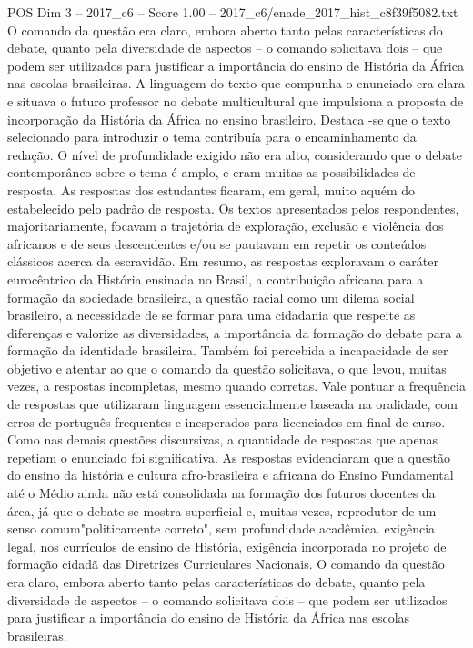\begin{textsample}{POS Dim 3 – 2017\_c6 – Score 1.00 – 2017\_c6/enade\_2017\_hist\_c8f39f5082.txt}
O comando da questão era claro, embora aberto tanto pelas características do debate, quanto pela diversidade de aspectos – o comando solicitava dois – que podem ser utilizados para justificar a importância do ensino de História da África nas escolas brasileiras.
A linguagem do texto que compunha o enunciado era clara e situava o futuro professor no debate multicultural que impulsiona a proposta de incorporação da História da África no ensino brasileiro.
Destaca -se que o texto selecionado para introduzir o tema contribuía para o encaminhamento da redação.
O nível de profundidade exigido não era alto, considerando que o debate contemporâneo sobre o tema é amplo, e eram muitas as possibilidades de resposta.
As respostas dos estudantes ficaram, em geral, muito aquém do estabelecido pelo padrão de resposta.
Os textos apresentados pelos respondentes, majoritariamente, focavam a trajetória de exploração, exclusão e violência dos africanos e de seus descendentes e/ou se pautavam em repetir os conteúdos clássicos acerca da escravidão.
Em resumo, as respostas exploravam o caráter eurocêntrico da História ensinada no Brasil, a contribuição africana para a formação da sociedade brasileira, a questão racial como um dilema social brasileiro, a necessidade de se formar para uma cidadania que respeite as diferenças e valorize as diversidades, a importância da formação do debate para a formação da identidade brasileira.
Também foi percebida a incapacidade de ser objetivo e atentar ao que o comando da questão solicitava, o que levou, muitas vezes, a respostas incompletas, mesmo quando corretas.
Vale pontuar a frequência de respostas que utilizaram linguagem essencialmente baseada na oralidade, com erros de português frequentes e inesperados para licenciados em final de curso.
Como nas demais questões discursivas, a quantidade de respostas que apenas repetiam o enunciado foi significativa.
As respostas evidenciaram que a questão do ensino da história e cultura afro-brasileira e africana do Ensino Fundamental até o Médio ainda não está consolidada na formação dos futuros docentes da área, já que o debate se mostra superficial e, muitas vezes, reprodutor de um senso comum"politicamente correto", sem profundidade acadêmica. exigência legal, nos currículos de ensino de História, exigência incorporada no projeto de formação cidadã das Diretrizes Curriculares Nacionais.
O comando da questão era claro, embora aberto tanto pelas características do debate, quanto pela diversidade de aspectos – o comando solicitava dois – que podem ser utilizados para justificar a importância do ensino de História da África nas escolas brasileiras.

\end{textsample}
